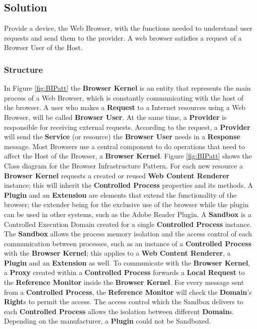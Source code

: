 \documentclass{sig-alternate-05-2015}
\begin{document}
  \subsection*{Solution}
  Provide a device, the Web Browser, with the functions needed to understand user requests and send them to the provider. A web browser satisfies a request of a Browser User of the Host.

    \subsubsection*{Structure}
    In Figure \ref{fig:BIPatt} the \textbf{Browser Kernel} is an entity that represents the main process of a Web Browser, which is constantly communicating with the host of the browser. A user who makes a \textbf{Request} to a Internet resources using a Web Browser, will be called \textbf{Browser User}. At the same time, a \textbf{Provider} is responsible for receiving external requests. According to the request, a \textbf{Provider} will send the \textbf{Service} (or resource) the \textbf{Browser User} needs in a \textbf{Response} message. Most Browsers use a central component to do operations that need to affect the Host of the Browser, a \textbf{Browser Kernel}. Figure \ref{fig:BIPatt} shows the Class diagram for the Browser Infrastructure Pattern. For each new resource a \textbf{Browser Kernel} requests a created or reused \textbf{Web Content Renderer} instance; this will inherit the \textbf{Controlled Process} properties and its methods. A \textbf{Plugin} and an \textbf{Extension} are elements that extend the functionality of the browser; the extender being for the exclusive use of the browser while the plugin can be used in other systems, such as the Adobe Reader Plugin. A \textbf{Sandbox} is a Controlled Execution Domain \cite{fernandez2013security} created for a single \textbf{Controlled Process} instance. The \textbf{Sandbox} allows the process memory isolation and the access control of each communication between processes, such as an instance of a \textbf{Controlled Process} with the \textbf{Browser Kernel}; this applies to a \textbf{Web Content Renderer}, a \textbf{Plugin} and an \textbf{Extension} as well. To communicate with the \textbf{Browser Kernel}, a \textbf{Proxy} created within a \textbf{Controlled Process} forwards a \textbf{Local Request} to the \textbf{Reference Monitor} inside the \textbf{Browser Kernel}. For every message sent from a \textbf{Controlled Process}, the \textbf{Reference Monitor} will check the \textbf{Domain}'s \textbf{Right}s to permit the access. The access control which the Sandbox delivers to each \textbf{Controlled Process} allows the isolation between different \textbf{Domain}s. Depending on the manufacturer, a \textbf{Plugin} could not be Sandboxed. 
\end{document}
